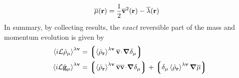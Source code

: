 \documentclass[b5paper,openright,11pt]{book}
\newcommand{\esc}{\!\cdot\!}
\newcommand{\llangle}{\left\langle}
\newcommand{\rrangle}{\right\rangle}
\newcommand{\llg}{\left\lgroup}
\newcommand{\rlg}{\right\rgroup}
\begin{document}
\begin{appendices}
\begin{align}
  \overline{\mu}({\bf r}) &=\frac{1}{2}\overline{\bf v}^2({\bf r})-\overline{\lambda}({\bf r})
\label{mufield}
\end{align}
In summary, by collecting results, the \textit{exact} reversible part of the mass and
momentum evolution is given by
\begin{align}
  \llangle i{\cal L}\hat{\rho}_\mu\rrangle^{\lambda{\bf v}} &=
  \llg\llangle \hat{\rho}_{\bf r}\rrangle^{\lambda{\bf v}}
\overline{\bf v}\esc\boldsymbol{\nabla}\delta_{\mu}\rlg
\nonumber\\
  \llangle i{\cal L}\hat{\bf g}_\mu\rrangle^{\lambda{\bf v}} &=
\llg\llangle \hat{\rho}_{\bf r}\rrangle^{\lambda{\bf v}}
\overline{\bf v}\overline{\bf v}\esc\boldsymbol{\nabla}\delta_{\mu}\rlg
+\llg\delta_\mu\llangle\hat{\rho}_{\bf r}\rrangle^{\lambda{\bf v}}\boldsymbol{\nabla}\overline{\mu}\rlg
\label{RevExact}
\end{align}



\end{appendices}
\end{document}
